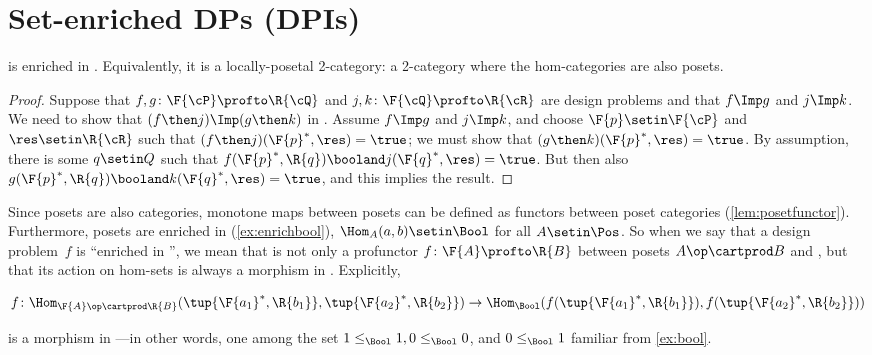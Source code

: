
\section{Set-enriched DPs (DPIs)}

\begin{proposition}
    \label{prop:DP_loc_pos}
    \DP is enriched in \Pos.
    Equivalently, it is a locally-posetal 2-category: a 2-category where the hom-categories are also posets.
\end{proposition}
\begin{proof}
    Suppose that $f,g\colon \F{\cP} \profto \R{\cQ}$ and $j,k\colon \F{\cQ} \profto \R{\cR}$ are design problems and that $f\Imp g$ and $j\Imp k$.
    We need to show that $(f\then j)\Imp(g\then k)$ in \DP.
    Assume $f\Imp g$ and $j\Imp k$, and choose $\F{p}\setin\F{\cP} $ and $\res\setin\R{\cR}$ such that $(f\then j)(\F{p}^*,\res)=\true$; we must show that $(g \then k)(\F{p}^*,\res)=\true$.
    By assumption, there is some $q\setin Q$ such that $f(\F{p}^*,\R{q})\booland j(\F{q}^*,\res)=\true$.
    But then also $g(\F{p}^*,\R{q})\booland k(\F{q}^*,\res)=\true$, and this implies the result.
\end{proof}
Since posets are also categories, monotone maps between posets can be defined as functors between poset categories (\cref{lem:posetfunctor}).
Furthermore, posets are enriched in \Bool (\cref{ex:enrichbool}), \ie $\Hom_A(a,b) \setin \Bool$ for all $A \setin \Pos$.
So when we say that a design problem~$f$ is ``enriched in \Bool'', we mean that is not only a profunctor $f \colon \F{A} \profto \R{B}$ between posets $A\op \cartprod B$ and \Bool, but that its action on hom-sets is always a morphism in \Bool.
Explicitly,

\begin{widepar}
    \begin{equation}
        f \colon \Hom_{\F{A}\op \cartprod \R{B}}(\tup{\F{a_1}^*,\R{b_1}}, \tup{\F{a_2}^*,\R{b_2}}) \to \Hom_\Bool(f(\tup{\F{a_1}^*,\R{b_1}}), f(\tup{\F{a_2}^*,\R{b_2}}))
    \end{equation}
\end{widepar}
is a morphism in \Bool---in other words, one among the set $1 \leq_\Bool 1, 0 \leq_\Bool 0$, and $0 \leq_\Bool 1$ familiar from \cref{ex:bool}.

